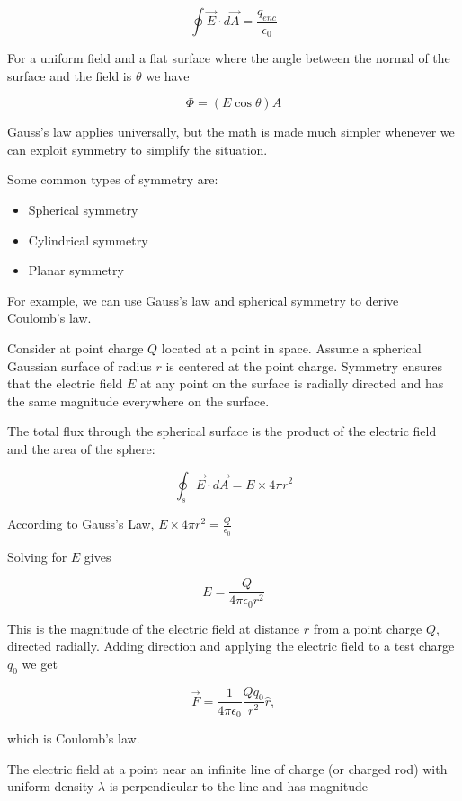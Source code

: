 \documentclass{article}
\begin{document}
\[ \oint \vec{E} \cdot d \vec{A} = \frac{q_{enc}}{\epsilon_0} \] 

For a uniform field and a flat surface where the angle between the normal of the surface and the field is $\theta$ we have

\[ \Phi = (E\cos\theta)A \]

Gauss's law applies universally, but the math is made much simpler whenever we can exploit symmetry to simplify the situation.

Some common types of symmetry are:

\begin{itemize}
\item Spherical symmetry
\end{itemize}

\begin{itemize}
\item Cylindrical symmetry
\end{itemize}

\begin{itemize}
\item Planar symmetry
\end{itemize}

For example, we can use Gauss's law and spherical symmetry to derive Coulomb's law.

Consider at point charge $Q$ located at a point in space. Assume a spherical Gaussian surface of radius $r$ is centered at the point charge. Symmetry ensures that the electric field $E$ at any point on the surface is radially directed and has the same magnitude everywhere on the surface.

The total flux through the spherical surface is the product of the electric field and the area of the sphere:

\[ \oint_s \vec{E} \cdot d\vec{A} = E \times 4 \pi r^2 \]

According to Gauss's Law, $E \times 4 \pi r^2 = \frac{Q}{\epsilon_0}$

Solving for $E$ gives

\[ E = \frac{Q}{4 \pi \epsilon_0 r^2} \]

This is the magnitude of the electric field at distance $r$ from a point charge $Q$, directed radially. Adding direction and applying the electric field to a test charge $q_0$ we get

\[ \vec{F} = \frac{1}{4\pi\epsilon_0} \frac{Qq_0}{r^2}\hat{r}, \]

which is Coulomb's law.

The electric field at a point near an infinite line of charge (or charged rod) with uniform density $\lambda$ is perpendicular to the line and has magnitude
\end{document}
